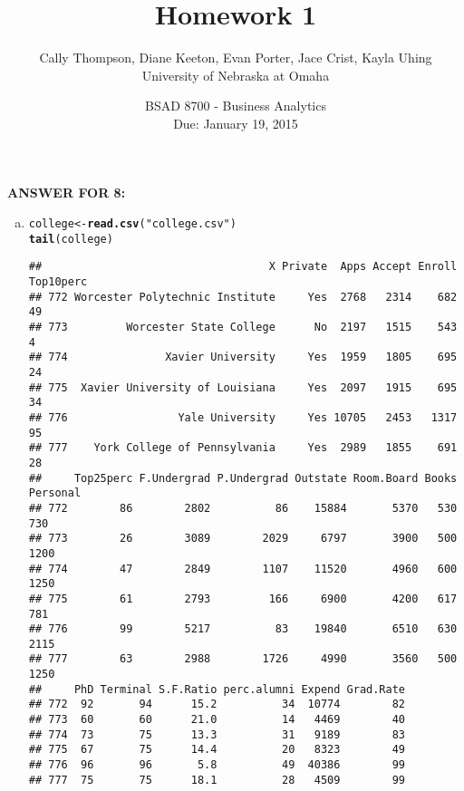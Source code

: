 \documentclass{article}\usepackage[]{graphicx}\usepackage[]{color}
\makeatletter
\newcommand{\hlstr}[1]{\textcolor[rgb]{0.192,0.494,0.8}{#1}}%
\newcommand{\hlstd}[1]{\textcolor[rgb]{0.345,0.345,0.345}{#1}}%
\newcommand{\hlkwb}[1]{\textcolor[rgb]{0.69,0.353,0.396}{#1}}%
\newcommand{\hlkwd}[1]{\textcolor[rgb]{0.737,0.353,0.396}{\textbf{#1}}}%
\newenvironment{kframe}{%
 \def\at@end@of@kframe{}%
 \ifinner\ifhmode%
  \def\at@end@of@kframe{\end{minipage}}%
  \begin{minipage}{\columnwidth}%
 \fi\fi%
 \def\FrameCommand##1{\hskip\@totalleftmargin \hskip-\fboxsep
 \colorbox{shadecolor}{##1}\hskip-\fboxsep
     \hskip-\linewidth \hskip-\@totalleftmargin \hskip\columnwidth}%
 \MakeFramed {\advance\hsize-\width
   \@totalleftmargin\z@ \linewidth\hsize
   \@setminipage}}%
 {\par\unskip\endMakeFramed%
 \at@end@of@kframe}
\newenvironment{knitrout}{}{} %
\makeatother
\begin{document}
\title{Homework 1}
\date{BSAD 8700 - Business Analytics\\ Due: January 19, 2015}
\author{Cally Thompson, Diane Keeton, Evan Porter, Jace Crist, Kayla Uhing\\ University of Nebraska at Omaha}
\maketitle

\textbf{ANSWER FOR 8:} \\


\begin{enumerate}[(a)]
\item
\begin{knitrout}
\color{fgcolor}\begin{kframe}
\begin{alltt}
\hlstd{college}\hlkwb{<-}\hlkwd{read.csv}\hlstd{(}\hlstr{"college.csv"}\hlstd{)}
\hlkwd{tail}\hlstd{(college)}
\end{alltt}
\begin{verbatim}
##                                   X Private  Apps Accept Enroll Top10perc
## 772 Worcester Polytechnic Institute     Yes  2768   2314    682        49
## 773         Worcester State College      No  2197   1515    543         4
## 774               Xavier University     Yes  1959   1805    695        24
## 775  Xavier University of Louisiana     Yes  2097   1915    695        34
## 776                 Yale University     Yes 10705   2453   1317        95
## 777    York College of Pennsylvania     Yes  2989   1855    691        28
##     Top25perc F.Undergrad P.Undergrad Outstate Room.Board Books Personal
## 772        86        2802          86    15884       5370   530      730
## 773        26        3089        2029     6797       3900   500     1200
## 774        47        2849        1107    11520       4960   600     1250
## 775        61        2793         166     6900       4200   617      781
## 776        99        5217          83    19840       6510   630     2115
## 777        63        2988        1726     4990       3560   500     1250
##     PhD Terminal S.F.Ratio perc.alumni Expend Grad.Rate
## 772  92       94      15.2          34  10774        82
## 773  60       60      21.0          14   4469        40
## 774  73       75      13.3          31   9189        83
## 775  67       75      14.4          20   8323        49
## 776  96       96       5.8          49  40386        99
## 777  75       75      18.1          28   4509        99

\end{verbatim}
\end{kframe}
\end{knitrout}
\end{enumerate}
\end{document}
